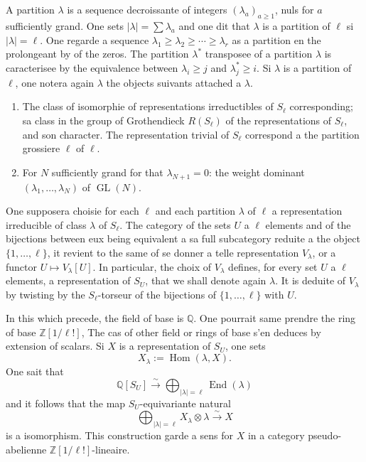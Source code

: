 \documentclass[11pt,a4paper]{article}
\theoremstyle{plain}
\theoremstyle{definition}
\DeclareMathOperator{\Hom}{Hom}
\DeclareMathOperator{\End}{End}
\DeclareMathOperator{\GL}{GL}
\newcommand{\Z}{\mathbb{Z}}
\newcommand{\Q}{\mathbb{Q}}
\newcommand{\isom}{\xrightarrow{\sim}}
\begin{document}
\subsection{}
A partition $\lambda$ is a sequence decroissante of integers $(\lambda_a)_{a \geq 1}$, nuls for $a$ sufficiently grand. One sets $|\lambda| = \sum \lambda_a$ and one dit that $\lambda$ is a partition of $\ell$ si $|\lambda| = \ell$. One regarde a sequence $\lambda_1 \geq \lambda_2 \geq \cdots \geq \lambda_r$ as a partition en the prolongeant by of the zeros. The partition $\lambda^*$ transposee of a partition $\lambda$ is caracterisee by the equivalence between $\lambda_i \geq j$ and $\lambda^*_j \geq i$. Si $\lambda$ is a partition of $\ell$, one notera again $\lambda$ the objects suivants attached a $\lambda$.
\begin{enumerate}[label=(\Alph*)]
\item The class of isomorphie of representations irreductibles of $S_\ell$ corresponding; sa class in the group of Grothendieck $R(S_\ell)$ of the representations of $S_\ell$, and son character. The representation trivial of $S_\ell$ correspond a the partition grossiere $\ell$ of $\ell$.
\item For $N$ sufficiently grand for that $\lambda_{N+1} = 0$: the weight dominant $(\lambda_1, \ldots, \lambda_N)$ of $\GL(N)$.
\end{enumerate}

One supposera choisie for each $\ell$ and each partition $\lambda$ of $\ell$ a representation irreducible of class $\lambda$ of $S_\ell$. The category of the sets $U$ a $\ell$ elements and of the bijections between eux being equivalent a sa full subcategory reduite a the object $\{1, \ldots, \ell\}$, it revient to the same of se donner a telle representation $V_\lambda$, or a functor $U \mapsto V_\lambda[U]$. In particular, the choix of $V_\lambda$ defines, for every set $U$ a $\ell$ elements, a representation of $S_U$, that we shall denote again $\lambda$. It is deduite of $V_\lambda$ by twisting by the $S_\ell$-torseur of the bijections of $\{1, \ldots, \ell\}$ with $U$.

In this which precede, the field of base is $\Q$. One pourrait same prendre the ring of base $\Z[1/\ell!]$, The cas of other field or rings of base s'en deduces by extension of scalars. Si $X$ is a representation of $S_U$, one sets
\begin{equation}
X_\lambda := \Hom(\lambda, X). \tag{1.10.1}
\end{equation}
One sait that
\begin{equation}
\Q[S_U] \isom \bigoplus_{|\lambda| = \ell} \End(\lambda) \tag{1.10.2}
\end{equation}
and it follows that the map $S_U$-equivariante natural
\begin{equation}
\bigoplus_{|\lambda| = \ell} X_\lambda \otimes \lambda \isom X \tag{1.10.3}
\end{equation}
is a isomorphism. This construction garde a sens for $X$ in a category pseudo-abelienne $\Z[1/\ell!]$-lineaire.
\end{document}

